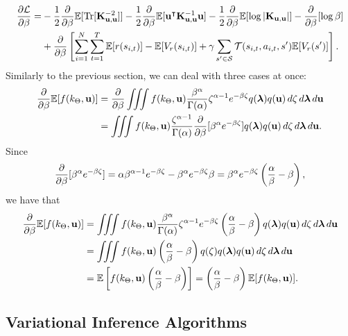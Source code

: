 \documentclass{mprop}
\theoremstyle{definition}
\DeclareMathOperator{\Tr}{Tr}
\begin{document}
\[
  \begin{split}
    \frac{\partial\mathcal{L}}{\partial\beta} = &-
    \frac{1}{2}\db\mathbb{E}[\Tr[\Kuu^{-2}]] -
    \frac{1}{2}\db\mathbb{E}[\mathbf{u}^\intercal\Kuu^{-1}\mathbf{u}] -
    \frac{1}{2}\db\mathbb{E}[\log|\Kuu|] - \db[\log\beta] \\
    &+ \db \left[ \sum_{i=1}^N \sum_{t=1}^T \mathbb{E}[r(s_{i,t})] -
      \mathbb{E}[V_r(s_{i,t})] + \gamma\sum_{s' \in \mathcal{S}}
      \mathcal{T}(s_{i,t}, a_{i,t}, s')\mathbb{E}[V_r(s')] \right].
  \end{split}
\]
Similarly to the previous section, we can deal with three cases at once:
\[
  \begin{split}
    \frac{\partial}{\partial\beta}\mathbb{E}[f(k_\Theta, \mathbf{u})] &= \frac{\partial}{\partial\beta} \iiint f(k_\Theta, \mathbf{u})
    \frac{\beta^\alpha}{\Gamma(\alpha)} \zeta^{\alpha - 1} e^{-\beta\zeta}
    q(\bm\lambda) q(\mathbf{u})\,d\zeta\,d\bm\lambda\,d\mathbf{u} \\
    &= \iiint f(k_\Theta, \mathbf{u}) \frac{\zeta^{\alpha - 1}}{\Gamma(\alpha)}
    \frac{\partial}{\partial\beta} [\beta^\alpha e^{-\beta\zeta}] q(\bm\lambda)
    q(\mathbf{u})\,d\zeta\,d\bm\lambda\,d\mathbf{u}.
  \end{split}
\]
Since
\[ \frac{\partial}{\partial\beta} [\beta^\alpha e^{-\beta\zeta}] = \alpha\beta^{\alpha - 1}e^{-\beta\zeta}
  - \beta^\alpha e^{-\beta\zeta}\beta = \beta^\alpha
  e^{-\beta\zeta} \left( \frac{\alpha}{\beta} - \beta \right), \]
we have that
\[
  \begin{split}
    \frac{\partial}{\partial\beta}\mathbb{E}[f(k_\Theta, \mathbf{u})] &= \iiint f(k_\Theta, \mathbf{u})
    \frac{\beta^\alpha}{\Gamma(\alpha)}\zeta^{\alpha - 1}e^{-\beta\zeta} \left(
      \frac{\alpha}{\beta} - \beta \right)  q(\bm\lambda)
    q(\mathbf{u})\,d\zeta\,d\bm\lambda\,d\mathbf{u} \\
    &= \iiint f(k_\Theta, \mathbf{u}) \left(\frac{\alpha}{\beta} - \beta \right)
    q(\zeta)q(\bm\lambda) q(\mathbf{u})\,d\zeta\,d\bm\lambda\,d\mathbf{u} \\
    &= \mathbb{E} \left[ f(k_\Theta, \mathbf{u}) \left( \frac{\alpha}{\beta} -
        \beta \right) \right] =  \left( \frac{\alpha}{\beta} - \beta \right)
    \mathbb{E} [f(k_\Theta, \mathbf{u})].
  \end{split}
\]

\subsection{Variational Inference Algorithms} \label{vi_algs}
\end{document}
